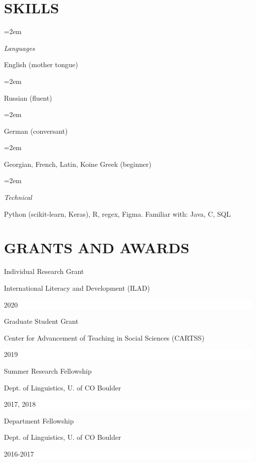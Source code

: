 \documentclass[paper=a4,fontsize=11pt]{article} %
\newlength{\spacebox}
\newcommand{\NewPart}[1]{\section*{\uppercase{#1}}}
\newcommand{\PersonalEntry}[2]{
		\hangindent=2em\hangafter=0 %
		\hspace*{\fill}
		\parbox{\spacebox}{        %
		\textit{#1}}		       %
		\hspace{1.5em} #2 \par}    %
\newcommand{\SkillsEntry}[2]{      %
		\noindent\hangindent=2em\hangafter=0 %
		\parbox{\spacebox}{        %
		\textit{#1}}			   %
		\hspace{1.5em} #2 \par}    %
\newcommand{\ListEntry}[3]{
		\noindent
		\parbox{13em}{        %
            #1}
        \hspace{.5em} 
        \parbox{23em}{
            #2} \hfill
		\colorbox{White}{%
			\parbox{5em}{%
			\hfill\color{Black}#3}}  \par}
\begin{document}







\NewPart{Skills}{}

\SkillsEntry{Languages}{English (mother tongue)}
\SkillsEntry{}{Russian (fluent)}
\SkillsEntry{}{German (conversant)}
\SkillsEntry{}{Georgian, French, Latin, Koine Greek (beginner)}

\SkillsEntry{Technical}{Python (scikit-learn, Keras), R, regex, 
Figma. Familiar with: Java, C, SQL}


\NewPart{Grants and Awards}{}

\ListEntry{Individual Research Grant}{International Literacy and Development (ILAD)}{2020}
\ListEntry{Graduate Student Grant}{Center for Advancement of Teaching in Social Sciences (CARTSS)}{2019}
\ListEntry{Summer Research Fellowship}{Dept. of Linguistics, U. of CO Boulder}{2017, 2018}
\ListEntry{Department Fellowship}{Dept. of Linguistics, U. of CO Boulder}{2016-2017}



\renewcommand{\bibsection}{\section*{PUBLICATIONS}}

\end{document}
